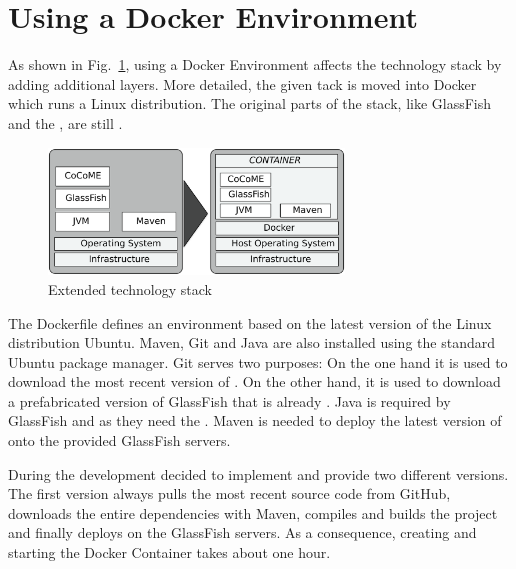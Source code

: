 \newpage

\section{Using a Docker Environment} \label{Docker}

As shown in Fig.~\ref{techStack}, using a Docker Environment affects the technology stack by adding additional layers. 
More detailed, the given \CoCoME {}tack is moved into  Docker  which runs a Linux distribution. 
The original parts of the stack, like GlassFish and the ,  are still .
	
	\begin{figure}[!h]
		\centering
		\includegraphics[width = 0.7\textwidth]{img/tech_stack_CoCoME.pdf}
		\caption{Extended technology stack \CoCoME}
		\label{techStack}
	\end{figure}
\noindent	
The Dockerfile defines an environment based on the latest version of the Linux distribution Ubuntu.
Maven, Git and Java are also installed using the standard Ubuntu package manager. %
Git serves two purposes: On the one hand it is used to download the most recent version of  \CoCoME {}.
On the other hand, it is used to download a prefabricated version of GlassFish that is already . 
Java is required by GlassFish and \CoCoME as they need the . 
Maven is needed to  deploy the latest version of \CoCoME onto the provided GlassFish servers.

During the development decided to implement and provide two different versions. 
The first version always pulls the most recent \CoCoME source code from GitHub, downloads the entire dependencies with Maven, compiles and builds the project and finally deploys \CoCoME on the GlassFish servers. 
As a consequence, creating and starting the Docker Container  takes about one hour.


